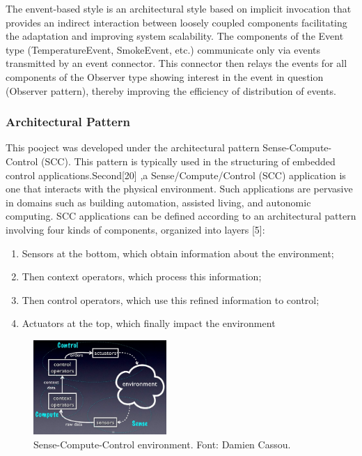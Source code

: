 \documentclass{acm_proc_article-sp}
\begin{document}
The envent-based style is an architectural style based on implicit invocation that provides an indirect interaction between loosely coupled components facilitating the adaptation and improving system scalability. The components of the Event type (TemperatureEvent, SmokeEvent, etc.) communicate only via events transmitted by an event connector. This connector then relays the events for all components of the Observer type showing interest in the event in question (Observer pattern), thereby improving the efficiency of distribution of events.

\subsubsection{Architectural Pattern}
This pooject was developed under the architectural pattern Sense-Compute-Control (SCC). This pattern is typically used in the structuring of embedded control applications.Second[20] ,a Sense/Compute/Control (SCC) application is one that interacts with the physical environment. Such applications are pervasive in domains such as building automation, assisted living, and autonomic computing. SCC applications can be defined according to an architectural pattern involving four kinds of components, organized into layers [5]: 
\begin{enumerate}
\item Sensors at the bottom, which obtain information about the environment; 
\item Then context operators, which process this information; 
\item Then control operators, which use this refined information to control;
\item Actuators at the top, which finally impact the environment
\end{enumerate}

\begin{figure}[h]
    \includegraphics[width=0.45\textwidth,natwidth=610,natheight=642]{pictures/senseComputeControl.png}
    \caption{Sense-Compute-Control environment. Font: Damien Cassou.}
    \label{fig:scc}
\end{figure}
\end{document}
